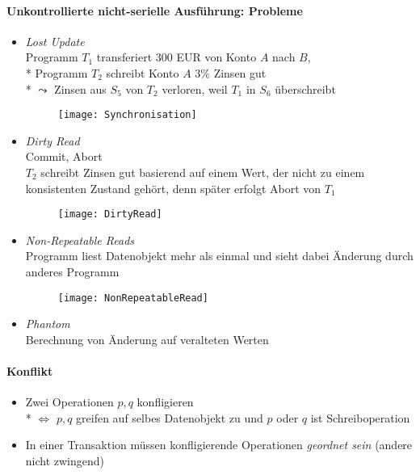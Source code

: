 \paragraph{Unkontrollierte nicht-serielle Ausführung: Probleme}
\begin{itemize}
	\item \emph{Lost Update}\\
		 Programm \( T_1 \) transferiert 300 EUR von Konto \( A \) nach \( B \),
		\\*
		Programm \( T_2 \) schreibt Konto \( A \) \( 3 \% \) Zinsen gut
		\\*
		\( \leadsto \) Zinsen aus \( S_5 \) von \( T_2 \) verloren, weil \( T_1 \) in \( S_6 \) überschreibt

	\begin{figure}[H]\centering\label{Synchronisation}\texttt{[image: Synchronisation]}\end{figure}
	
	\item \emph{Dirty Read}\\
		Commit, Abort \\
		\( T_2 \) schreibt Zinsen gut basierend auf einem Wert, der nicht zu einem konsistenten Zustand gehört, denn später erfolgt Abort von \( T_1 \)

	\begin{figure}[H]\centering\label{DirtyRead}\texttt{[image: DirtyRead]}\end{figure}
	
	\item \emph{Non-Repeatable Reads}\\
		 Programm liest Datenobjekt mehr als einmal und sieht dabei Änderung durch anderes Programm
	\begin{figure}[H]\centering\label{NonRepeatableRead}\texttt{[image: NonRepeatableRead]}\end{figure}
	
	\item \emph{Phantom}\\
		Berechnung von Änderung auf veralteten Werten
\end{itemize}

\paragraph{Konflikt}
\begin{itemize}
	\item Zwei Operationen \( p, q \) konfligieren
		\\*
		\( \Leftrightarrow \) \( p,q \) greifen auf selbes Datenobjekt zu und \( p \) oder \( q \) ist Schreiboperation
	\item In einer Transaktion müssen konfligierende Operationen \emph{geordnet sein} (andere nicht zwingend)
\end{itemize}

